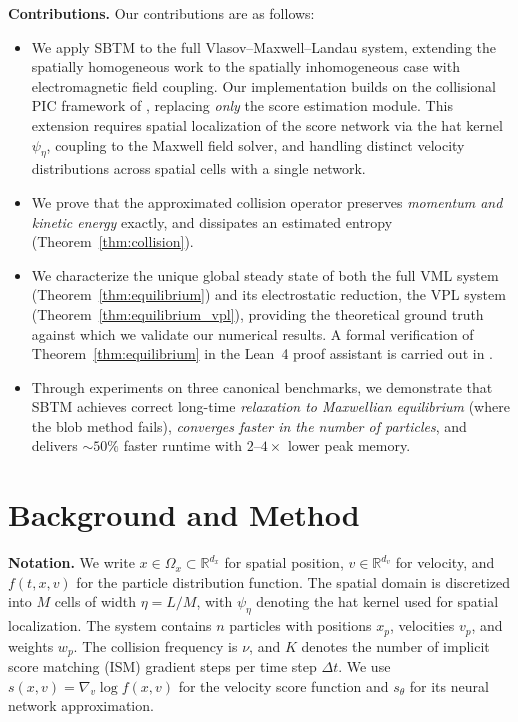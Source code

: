 \documentclass[]{article}
\newcommand{\R}{\mathbb{R}}
\numberwithin{equation}{section}
\begin{document}
\textbf{Contributions.} Our contributions are as follows:
\begin{itemize}
\item We apply SBTM to the full Vlasov--Maxwell--Landau system, extending the spatially homogeneous work \citep{ilin2025transport} to the spatially inhomogeneous case with electromagnetic field coupling.  Our implementation builds on the collisional PIC framework of \citep{bailo2024collisional}, replacing \emph{only} the score estimation module.  This extension requires spatial localization of the score network via the hat kernel $\psi_\eta$, coupling to the Maxwell field solver, and handling distinct velocity distributions across spatial cells with a single network.
\item We prove that the approximated collision operator preserves \emph{momentum and kinetic energy} exactly, and dissipates an estimated entropy (Theorem~\ref{thm:collision}).
\item We characterize the unique global steady state of both the full VML system (Theorem~\ref{thm:equilibrium}) and its electrostatic reduction, the VPL system (Theorem~\ref{thm:equilibrium_vpl}), providing the theoretical ground truth against which we validate our numerical results.  A formal verification of Theorem~\ref{thm:equilibrium} in the Lean~4 proof assistant is carried out in \citep{ilin2026formalization}.
\item Through experiments on three canonical benchmarks, we demonstrate that SBTM achieves correct long-time \emph{relaxation to Maxwellian equilibrium} (where the blob method fails), \emph{converges faster in the number of particles}, and delivers ${\sim}50\%$ faster runtime with $2$--$4\times$ lower peak memory.
\end{itemize}



\section{Background and Method}
\label{sec:method}

\textbf{Notation.}  We write $x \in \Omega_x \subset \R^{d_x}$ for spatial position, $v \in \R^{d_v}$ for velocity, and $f(t,x,v)$ for the particle distribution function.  The spatial domain is discretized into $M$ cells of width $\eta = L/M$, with $\psi_\eta$ denoting the hat kernel used for spatial localization.  The system contains $n$ particles with positions $x_p$, velocities $v_p$, and weights $w_p$.  The collision frequency is $\nu$, and $K$ denotes the number of implicit score matching (ISM) gradient steps per time step $\Delta t$.  We use $s(x,v) = \nabla_v \log f(x,v)$ for the velocity score function and $s_\theta$ for its neural network approximation.
\end{document}
